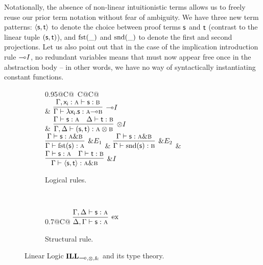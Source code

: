 Notationally, the absence of non-linear intuitionistic terms allows us to freely reuse our prior term notation without fear of ambiguity.
We have three new term patterns: $\langle \mathsf{s}, \mathsf{t} \rangle$ to denote the choice between proof terms $\mathsf{s}$ and $\mathsf{t}$ (contrast to the linear tuple $(\mathsf{s}, \mathsf{t})$), and $\textrm{fst}(\_)$ and $\textrm{snd}(\_)$ to denote the first and second projections.
Let us also point out that in the case of the implication introduction rule $\li I$, no redundant variables means that  must now appear free once in the abstraction body  -- in other words, we have no way of syntactically instantiating constant functions.

\begin{figure}
	\centering
	\begin{subfigure}{1\textwidth}
		\centering
		\begin{tabularx}{0.95\textwidth}{@{}C@{~}C@{\qquad}C@{}}
		\\[2em]
		& 
		$\infer[\li I]{\Gamma \vdash \term{\lambda x_i .s}: \prop A \li \prop B}{\Gamma, \term{x_i }: \prop A \vdash \term{s}: \prop B}$\\[\smallsep]
		&
		$\infer[\otimes I]{\Gamma, \Delta \vdash (\term{s}, \term{t}): \prop A \otimes \prop B}{\Gamma \vdash \term{s}: \prop A & \Delta \vdash \term{t}: \prop B}$\\[\smallsep]
		$
		\infer[\with E_1]{\Gamma \vdash \cterm{fst(\smallterm{s})}: \prop{A}}{\Gamma \vdash \smallterm{s}: \prop{A} \with \prop{B}}
		$
		&
		$
		\infer[\with E_2]{\Gamma \vdash \cterm{snd(\smallterm{s})}: \prop{B}}{\Gamma \vdash \term{s}: \prop{A} \with \prop{B}}
		$
		&
		$
		\infer[\with I]{\Gamma \vdash \langle\term{s}, \term{t}\rangle: \prop{A} \with \prop{B}}{\Gamma \vdash \term{s}: \prop{A} & \Gamma \vdash \term{t}: \prop{B}}
		$
		\end{tabularx}
		\caption{Logical rules.}
		\label{subfigure:linear_logic_rules:logical}
	\end{subfigure}\\[\midsep]
	\begin{subfigure}{1\textwidth}
		\centering
		\begin{tabularx}{0.7\textwidth}{@{}C@{}}
		$
		\infer[\Exchange{}]{\Delta, \Gamma \vdash \term{s}: \prop{A}}{\Gamma, \Delta \vdash \term{s}:  \prop{A}}
		$
		\end{tabularx}
		\caption{Structural rule.}
		\label{subfigure:linear_logic_rules:structural}
	\end{subfigure}
	\caption{Linear Logic $\ILL_{\li,\otimes,\with}$ and its type theory.}
	\label{figure:linear_logic_rules}
\end{figure}


